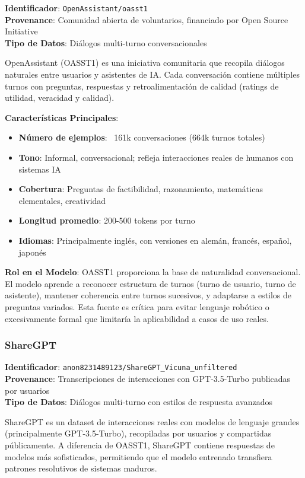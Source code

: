 \textbf{Identificador}: \texttt{OpenAssistant/oasst1}~\cite{kopf2023openassistant} \\
\textbf{Provenance}: Comunidad abierta de voluntarios, financiado por Open Source Initiative \\
\textbf{Tipo de Datos}: Diálogos multi-turno conversacionales

OpenAssistant (OASST1) es una iniciativa comunitaria que recopila diálogos naturales entre usuarios y asistentes de IA. Cada conversación contiene múltiples turnos con preguntas, respuestas y retroalimentación de calidad (ratings de utilidad, veracidad y calidad).

\textbf{Características Principales}:
\begin{itemize}
    \item \textbf{Número de ejemplos}: ~161k conversaciones (664k turnos totales)
    \item \textbf{Tono}: Informal, conversacional; refleja interacciones reales de humanos con sistemas IA
    \item \textbf{Cobertura}: Preguntas de factibilidad, razonamiento, matemáticas elementales, creatividad
    \item \textbf{Longitud promedio}: 200-500 tokens por turno
    \item \textbf{Idiomas}: Principalmente inglés, con versiones en alemán, francés, español, japonés
\end{itemize}

\textbf{Rol en el Modelo}: OASST1 proporciona la base de naturalidad conversacional. El modelo aprende a reconocer estructura de turnos (turno de usuario, turno de asistente), mantener coherencia entre turnos sucesivos, y adaptarse a estilos de preguntas variados. Esta fuente es crítica para evitar lenguaje robótico o excesivamente formal que limitaría la aplicabilidad a casos de uso reales.

\subsubsection{ShareGPT}

\textbf{Identificador}: \texttt{anon8231489123/ShareGPT\_Vicuna\_unfiltered}~\cite{vicuna2023} \\
\textbf{Provenance}: Transcripciones de interacciones con GPT-3.5-Turbo publicadas por usuarios \\
\textbf{Tipo de Datos}: Diálogos multi-turno con estilos de respuesta avanzados

ShareGPT es un dataset de interacciones reales con modelos de lenguaje grandes (principalmente GPT-3.5-Turbo), recopiladas por usuarios y compartidas públicamente. A diferencia de OASST1, ShareGPT contiene respuestas de modelos más sofisticados, permitiendo que el modelo entrenado transfiera patrones resolutivos de sistemas maduros.

